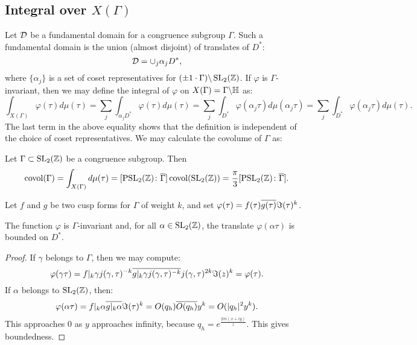 \subsection{Integral over \texorpdfstring{$X(\Gamma)$}{X(Gamma)}}
Let $\mathcal{D}$ be a fundamental domain for a congruence subgroup $\Gamma$. Such a fundamental domain is the union (almost disjoint) of translates of $D^*$:
\[
\mathcal{D}=\cup_j \alpha_j D^*,
\]
where $\{\alpha_j\}$ is a set of coset representatives for $(\pm 1\cdot \Gamma)\backslash \operatorname{SL}_2(\mathbb{Z})$. If $\varphi$ is $\Gamma$-invariant, then we may define the integral of $\varphi$ on $X(\Gamma)=\Gamma\backslash \mathbb{H}$ as:
\[
\int_{X(\Gamma)} \varphi(\tau) d\mu(\tau) = \sum_j \int_{\alpha_j D^*} \varphi(\tau)d\mu(\tau) = \sum_j\int_{D^*} \varphi(\alpha_j\tau)d\mu(\alpha_j\tau)=\sum_j\int_{D^*} \varphi(\alpha_j\tau)d\mu(\tau).
\]
The last term in the above equality shows that the definition is independent of the choice of coset representatives. We may calculate the covolume of $\Gamma$ as:
\begin{lemma}
\label{lemma:covolume}
Let $\Gamma\subset\operatorname{SL}_2(\mathbb{Z})$ be a congruence subgroup. Then
\[  \operatorname{covol}(\Gamma)= \int_{X(\Gamma)} d\mu(\tau) = [\operatorname{PSL}_2(\mathbb{Z})\colon \overline{\Gamma}]\operatorname{covol}(\operatorname{SL}_2(\mathbb{Z})) = \frac{\pi}{3} [\operatorname{PSL}_2(\mathbb{Z})\colon \overline{\Gamma}].\]
\end{lemma}

Let $f$ and $g$ be two cusp forms for $\Gamma$ of weight $k$, and set $\varphi(\tau)=f(\tau)\overline{g(\tau)}\Im(\tau)^k$.
\begin{lemma}
 The function $\varphi$ is $\Gamma$-invariant and, for all $\alpha\in \operatorname{SL}_2(\mathbb{Z})$, the translate $\varphi(\alpha\tau)$ is bounded on $D^*$.
\end{lemma}
\begin{proof}
  If $\gamma$ belongs to $\Gamma$, then we may compute:
\[
\varphi(\gamma\tau)=f|_k\gamma j(\gamma,\tau)^{-k}\overline{g|_k\gamma j(\gamma,\tau)^{-k}} j(\gamma,\tau)^{2k}\Im(z)^k = \varphi(\tau).
\]
If $\alpha$ belongs to $\operatorname{SL}_2(\mathbb{Z})$, then:
\[
\varphi(\alpha\tau)=f|_k\alpha \overline{g|_k\alpha}\Im(\tau)^k = O(q_h)\overline{O(q_h)} y^k = O(|q_h|^2 y^k).
\]
This approaches $0$ as $y$ approaches infinity, because $q_h = e^{\frac{2\pi i (x+iy)}{z}}$. This gives boundedness.
\end{proof}

